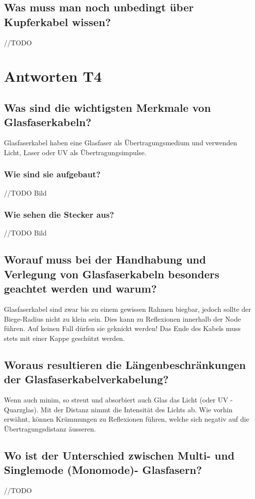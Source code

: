 \subsection*{Was muss man noch unbedingt über Kupferkabel wissen?}
//TODO

\section{Antworten T4}
\subsection*{Was sind die wichtigsten Merkmale von Glasfaserkabeln?}
Glasfaserkabel haben eine Glasfaser als Übertragungsmedium und verwenden Licht, Laser oder UV als Übertragungsimpulse.

\subsubsection*{Wie sind sie aufgebaut?}
//TODO Bild

\subsubsection*{Wie sehen die Stecker aus?}
//TODO Bild

\subsection*{Worauf muss bei der Handhabung und Verlegung von Glasfaserkabeln besonders geachtet werden und warum?}
Glasfaserkabel sind zwar bis zu einem gewissen Rahmen biegbar, jedoch sollte der Biege-Radius nicht zu klein sein. Dies kann zu Reflexionen innerhalb der Node führen. Auf keinen Fall dürfen sie geknickt werden! Das Ende des Kabels muss stets mit einer Kappe geschützt werden.

\subsection*{Woraus resultieren die Längenbeschränkungen der Glasfaserkabelverkabelung?}
Wenn auch minim, so streut und absorbiert auch Glas das Licht (oder UV - Quarzglas). Mit der Distanz nimmt die Intensität des Lichts ab. Wie vorhin erwähnt, können Krümmungen zu Reflexionen führen, welche sich negativ auf die Übertragungsdistanz äusseren.

\subsection*{Wo ist der Unterschied zwischen Multi- und Singlemode (Monomode)- Glasfasern?}
//TODO

